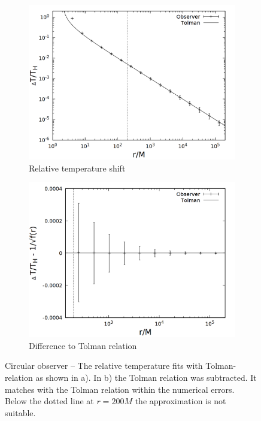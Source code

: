 \begin{figure}[h]
  \centering
  \begin{subfigure}[h]{0.5\textwidth}
    \centering
    \includegraphics[width=\textwidth]{cpp/final/circ.png}
    \caption{Relative temperature shift}
  \end{subfigure}%
  \begin{subfigure}[h]{0.5\textwidth}
    \centering
    \includegraphics[width=\textwidth]{cpp/final/circ_tolman.png}
    \caption{Difference to Tolman relation}
  \end{subfigure}
  \caption{Circular observer -- The relative temperature fits with Tolman-relation as shown in a). In b) the Tolman relation was subtracted. It matches with the Tolman relation within the numerical errors. Below the dotted line at \(r = 200M\) the approximation is not suitable.}
  \label{fig:bh_circ}
\end{figure} 


